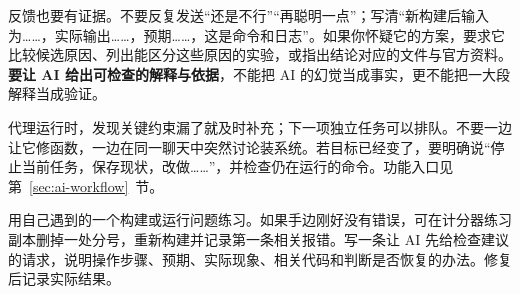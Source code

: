 反馈也要有证据。不要反复发送“还是不行”“再聪明一点”；写清“新构建后输入为……，实际输出……，预期……，这是命令和日志”。如果你怀疑它的方案，要求它比较候选原因、列出能区分这些原因的实验，或指出结论对应的文件与官方资料。\textbf{要让 AI 给出可检查的解释与依据}，不能把 AI 的幻觉当成事实，更不能把一大段解释当成验证。

代理运行时，发现关键约束漏了就及时补充；下一项独立任务可以排队。不要一边让它修函数，一边在同一聊天中突然讨论装系统。若目标已经变了，要明确说“停止当前任务，保存现状，改做……”，并检查仍在运行的命令。功能入口见第~\ref{sec:ai-workflow}~节。

\begin{exercise}\label{ex:ai-prompt}
用自己遇到的一个构建或运行问题练习。如果手边刚好没有错误，可在计分器练习副本删掉一处分号，重新构建并记录第一条相关报错。写一条让 AI 先给检查建议的请求，说明操作步骤、预期、实际现象、相关代码和判断是否恢复的办法。修复后记录实际结果。
\end{exercise}
